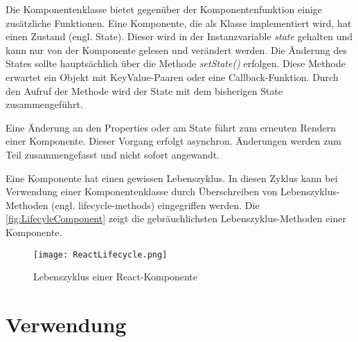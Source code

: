 Die Komponentenklasse bietet gegenüber der Komponentenfunktion einige zusätzliche Funktionen. Eine  Komponente, die als Klasse implementiert wird, hat einen Zustand (engl. State). Dieser wird in der Instanzvariable \textit{state} gehalten und kann nur von der Komponente gelesen und verändert werden. Die Änderung des States sollte hauptsächlich über die Methode \textit{setState()} erfolgen. Diese Methode  erwartet ein Objekt mit KeyValue-Paaren oder eine Callback-Funktion. Durch den Aufruf der Methode wird der State mit dem bisherigen State zusammengeführt.\autocites[vgl.][24\psq,89-93]{Zeigermann.2016}[vgl.][17\psq]{Stefanov.2017}

Eine Änderung an den Properties oder am State führt zum erneuten Rendern einer Komponente. Dieser Vorgang erfolgt asynchron. Änderungen werden zum Teil zusammengefasst und nicht sofort angewandt. \autocites[vgl.][24\psq, 90\psq]{Zeigermann.2016}


Eine Komponente hat einen gewissen Lebenszyklus. In diesen Zyklus kann bei Verwendung einer Komponentenklasse durch Überschreiben von Lebenszyklus-Methoden (engl. lifecycle-methods) eingegriffen werden. Die \autoref{fig:LifecyleComponent} zeigt die gebräuchlichsten Lebenszyklus-Methoden einer Komponente.\autocites[vgl.][96-100]{Zeigermann.2016}[vgl.][]{Facebook.2018}


\begin{figure}
	\centering
	\texttt{[image: ReactLifecycle.png]}
	\caption{Lebenszyklus einer  React-Komponente} 
	\label{fig:LifecyleComponent}
\end{figure}


   


  

\section{Verwendung}


